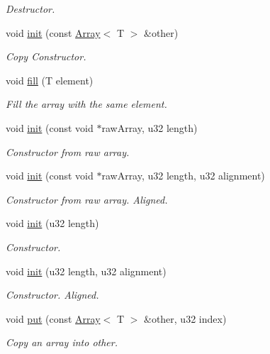 \begin{DoxyCompactItemize}
\begin{DoxyCompactList}\small\item\em Destructor. \end{DoxyCompactList}\item 
void \hyperlink{classDE_1_1Array_a160b6d7bde381664d3a77c7bc72c7126}{init} (const \hyperlink{classDE_1_1Array}{Array}$<$ T $>$ \&other)
\begin{DoxyCompactList}\small\item\em Copy Constructor. \end{DoxyCompactList}\item 
void \hyperlink{classDE_1_1Array_a9e73e8109d4a8e1839c45f2443eb5f39}{fill} (T element)
\begin{DoxyCompactList}\small\item\em Fill the array with the same element. \end{DoxyCompactList}\item 
void \hyperlink{classDE_1_1Array_ada28dc6169242ba65cdeb09492325d37}{init} (const void $\ast$raw\+Array, u32 length)
\begin{DoxyCompactList}\small\item\em Constructor from raw array. \end{DoxyCompactList}\item 
void \hyperlink{classDE_1_1Array_a0d1eddcb3e2c649f47ec4c267a2852dd}{init} (const void $\ast$raw\+Array, u32 length, u32 alignment)
\begin{DoxyCompactList}\small\item\em Constructor from raw array. Aligned. \end{DoxyCompactList}\item 
void \hyperlink{classDE_1_1Array_a4dd983d3c4bf4f909d73f3ea5c18e305}{init} (u32 length)
\begin{DoxyCompactList}\small\item\em Constructor. \end{DoxyCompactList}\item 
void \hyperlink{classDE_1_1Array_a3757f2ca798d13fc52a0b62099c8927e}{init} (u32 length, u32 alignment)
\begin{DoxyCompactList}\small\item\em Constructor. Aligned. \end{DoxyCompactList}\item 
void \hyperlink{classDE_1_1Array_a2b0b137f752a2cf067359581e95bcd46}{put} (const \hyperlink{classDE_1_1Array}{Array}$<$ T $>$ \&other, u32 index)
\begin{DoxyCompactList}\small\item\em Copy an array into other. \end{DoxyCompactList}\item 

\end{DoxyCompactItemize}
